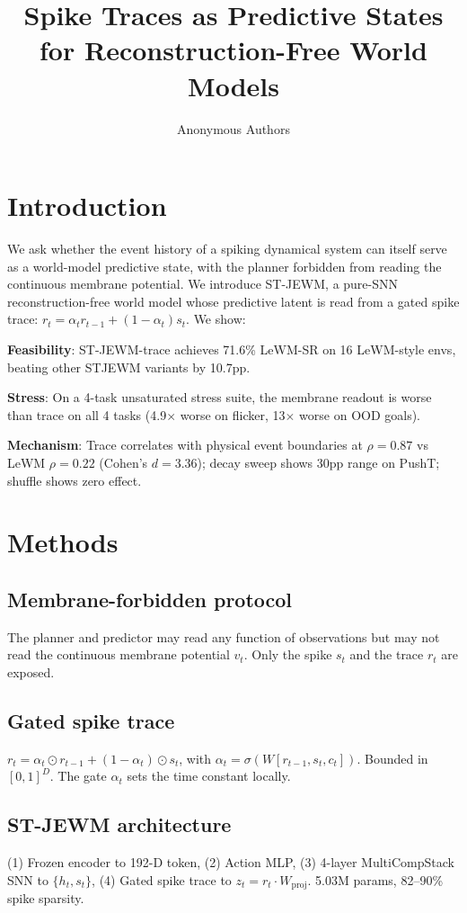 \documentclass{article}
\title{Spike Traces as Predictive States for Reconstruction-Free World Models}
\author{Anonymous Authors}
\date{}
\begin{document}
\maketitle

\section{Introduction}

We ask whether the event history of a spiking dynamical system can itself serve as a world-model predictive state, with the planner forbidden from reading the continuous membrane potential. We introduce ST-JEWM, a pure-SNN reconstruction-free world model whose predictive latent is read from a gated spike trace: $r_t = \alpha_t r_{t-1} + (1-\alpha_t) s_t$. We show:

\textbf{Feasibility}: ST-JEWM-trace achieves 71.6\% LeWM-SR on 16 LeWM-style envs, beating other STJEWM variants by 10.7pp.

\textbf{Stress}: On a 4-task unsaturated stress suite, the membrane readout is worse than trace on all 4 tasks (4.9$\times$ worse on flicker, 13$\times$ worse on OOD goals).

\textbf{Mechanism}: Trace correlates with physical event boundaries at $\rho=0.87$ vs LeWM $\rho=0.22$ (Cohen's $d=3.36$); decay sweep shows 30pp range on PushT; shuffle shows zero effect.

\section{Methods}

\subsection{Membrane-forbidden protocol}
The planner and predictor may read any function of observations but may not read the continuous membrane potential $v_t$. Only the spike $s_t$ and the trace $r_t$ are exposed.

\subsection{Gated spike trace}
$r_t = \alpha_t \odot r_{t-1} + (1 - \alpha_t) \odot s_t$, with $\alpha_t = \sigma(W [r_{t-1}, s_t, c_t])$. Bounded in $[0,1]^D$. The gate $\alpha_t$ sets the time constant locally.

\subsection{ST-JEWM architecture}
(1) Frozen encoder to 192-D token, (2) Action MLP, (3) 4-layer MultiCompStack SNN to $\{h_t, s_t\}$, (4) Gated spike trace to $z_t = r_t \cdot W_\text{proj}$. 5.03M params, 82--90\% spike sparsity.
\end{document}
